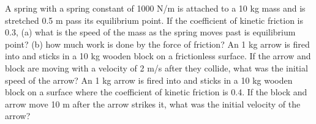 \documentclass[12pt]{article}
\begin{document}
\noindent A spring with a spring constant of 1000 N/m is attached to a 10 kg mass and is stretched 0.5 m pass its equilibrium point.  If the coefficient of 
kinetic friction is 0.3, (a) what is the speed of the mass as the spring moves past is equilibrium point?  (b) how much work is done by the force of friction?
\newpage
\noindent An 1 kg arrow is fired into and sticks in a 10 kg wooden block on a frictionless surface.  If the arrow and block are moving with a velocity of 2 m/s after they collide, what was the initial speed of the arrow?
\newpage
\noindent An 1 kg arrow is fired into and sticks in a 10 kg wooden block on a surface where the coefficient of kinetic friction is 0.4.  If the block and arrow move 10 m after the arrow strikes it, what was the initial velocity of the arrow?
\end{document}
